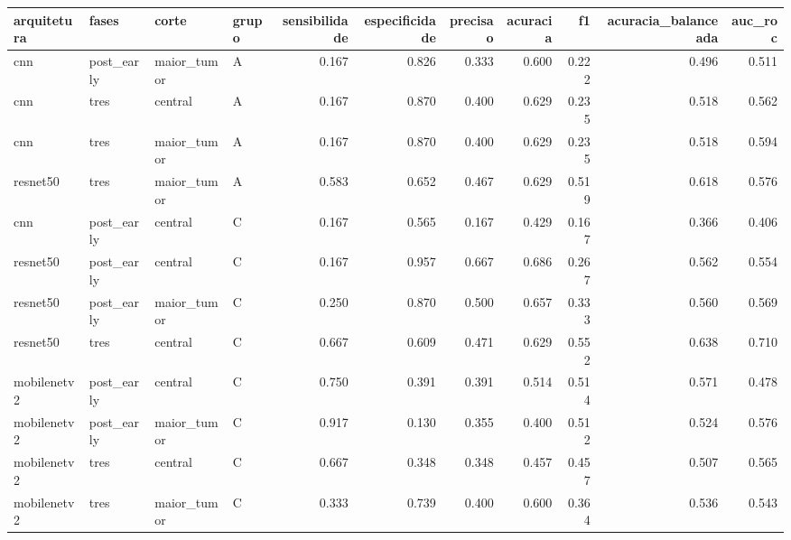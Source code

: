 \begin{tabular}{llllrrrrrrr}
\toprule
arquitetura & fases & corte & grupo & sensibilidade & especificidade & precisao & acuracia & f1 & acuracia\_balanceada & auc\_roc \\
\midrule
cnn & post\_early & maior\_tumor & A & 0.167 & 0.826 & 0.333 & 0.600 & 0.222 & 0.496 & 0.511 \\
cnn & tres & central & A & 0.167 & 0.870 & 0.400 & 0.629 & 0.235 & 0.518 & 0.562 \\
cnn & tres & maior\_tumor & A & 0.167 & 0.870 & 0.400 & 0.629 & 0.235 & 0.518 & 0.594 \\
resnet50 & tres & maior\_tumor & A & 0.583 & 0.652 & 0.467 & 0.629 & 0.519 & 0.618 & 0.576 \\
cnn & post\_early & central & C & 0.167 & 0.565 & 0.167 & 0.429 & 0.167 & 0.366 & 0.406 \\
resnet50 & post\_early & central & C & 0.167 & 0.957 & 0.667 & 0.686 & 0.267 & 0.562 & 0.554 \\
resnet50 & post\_early & maior\_tumor & C & 0.250 & 0.870 & 0.500 & 0.657 & 0.333 & 0.560 & 0.569 \\
resnet50 & tres & central & C & 0.667 & 0.609 & 0.471 & 0.629 & 0.552 & 0.638 & 0.710 \\
mobilenetv2 & post\_early & central & C & 0.750 & 0.391 & 0.391 & 0.514 & 0.514 & 0.571 & 0.478 \\
mobilenetv2 & post\_early & maior\_tumor & C & 0.917 & 0.130 & 0.355 & 0.400 & 0.512 & 0.524 & 0.576 \\
mobilenetv2 & tres & central & C & 0.667 & 0.348 & 0.348 & 0.457 & 0.457 & 0.507 & 0.565 \\
mobilenetv2 & tres & maior\_tumor & C & 0.333 & 0.739 & 0.400 & 0.600 & 0.364 & 0.536 & 0.543 \\
\bottomrule
\end{tabular}
